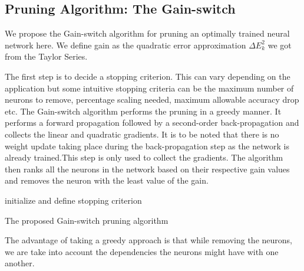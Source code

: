 \subsection{Pruning Algorithm: The Gain-switch}
We propose the Gain-switch algorithm for pruning an optimally trained neural network here. We define gain as the quadratic error approximation $\Delta E_{k}^2$ we got from the Taylor Series.

The first step is to  decide a stopping criterion. This can vary depending on the application but some intuitive stopping criteria can be the maximum number of neurons to remove, percentage scaling needed, maximum allowable accuracy drop etc. The Gain-switch algorithm performs the pruning in a greedy manner. It performs a forward propagation followed by a second-order back-propagation and collects the linear and quadratic gradients. It is to be noted that there is no weight update taking place during the back-propagation step as the network is already trained.This step is only used to collect the gradients. The algorithm then ranks all the neurons in the network based on their respective gain values and removes the neuron with the least value of the gain. 

\begin{algorithm}[H]
 initialize and define stopping criterion \;
 \caption{The proposed Gain-switch pruning algorithm}
\end{algorithm}

The advantage of taking a greedy approach is that while removing the neurons, we are take into account the dependencies the neurons might have with one another. 